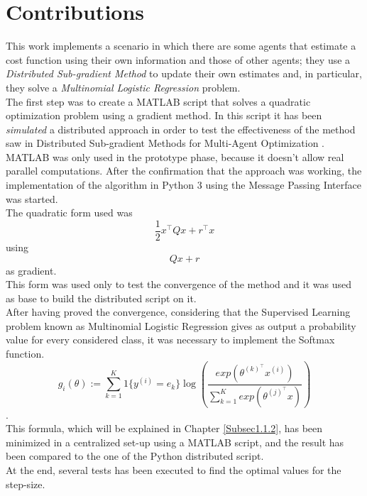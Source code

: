 \documentclass[a4paper,11pt,oneside]{book}
\begin{document}
\section*{Contributions}
This work implements a scenario in which there are some agents that estimate a cost function using their own information and those of other agents; they use a \textit{Distributed Sub-gradient Method} to update their own estimates and, in particular, they solve a \textit{Multinomial Logistic Regression} problem.\\

The first step was to create a MATLAB script that solves a quadratic optimization problem using a gradient method. In this script it has been \textit{simulated} a distributed approach in order to test the effectiveness of the method saw in Distributed Sub-gradient Methods for Multi-Agent Optimization \cite{CITATION:1}. MATLAB was only used in the prototype phase, because it doesn't allow real parallel computations. After the confirmation that the approach was working, the implementation of the algorithm in Python 3 using the Message Passing Interface was started.\\
The quadratic form used was 
\begin{equation} \tag{I}
\dfrac{1}{2}x^{\top}Qx + r^{\top}x
\end{equation}
using
\begin{equation} \tag{II}
	Qx + r
\end{equation}
as gradient. \\
This form was used only to test the convergence of the method and it was used as base to build the distributed script on it.\\
After having proved the convergence, considering that the Supervised Learning problem known as Multinomial Logistic Regression gives as output a probability value for every considered class, it was necessary to implement the Softmax function. 
\begin{equation} \tag{III}
g_i\left(\theta\right):=\sum_{k=1}^{K}{1\{y^{(i)}=e_k\}\log{\left( \frac{exp(\theta^{(k)^\top}x^{(i)})}{\sum_{k=1}^{K}{exp( \theta^{(j)^\top}x )}} \right)}}
\end{equation} \cite{CITATION:3}. \\
This formula, which will be explained in Chapter \ref{Subsec1.1.2}, has been minimized in a centralized set-up using a MATLAB script, and the result has been compared to the one of the Python distributed script.\\
At the end, several tests has been executed to find the optimal values for the step-size.\\
\end{document}
